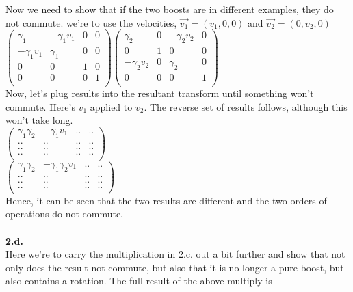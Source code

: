 \documentclass[prb,preprint]
{revtex4-1}
\newcommand{\PRLsep}{\noindent\makebox[\linewidth]{\resizebox{0.8888\linewidth}{2pt}{$\bullet$}}\bigskip}
\begin{document}
Now we need to show that if the two boosts are in different examples, they do not commute.  we're to use the velocities, $\vec{v_1} = \left(v_1, 0, 0\right)$ and $\vec{v_2} = \left(0, v_2, 0\right)$
\\
$\begin{pmatrix}
\gamma_1 & -\gamma_1 v_1 & 0 & 0\\
-\gamma_1 v_1 & \gamma_1 & 0 & 0\\
0 & 0 & 1 & 0\\
0 & 0 & 0 & 1\\
\end{pmatrix} 
\begin{pmatrix}
\gamma_2 & 0 & -\gamma_2 v_2 & 0\\
0 & 1 & 0 & 0\\
-\gamma_2 v_2 & 0 & \gamma_2 & 0\\
0 & 0 & 0 & 1\\
\end{pmatrix} $
\\
Now, let's plug results into the resultant transform until something won't commute.  Here's $v_1$ applied to $v_2$.  The reverse set of results follows, although this won't take long.
\\
$\begin{pmatrix}
\gamma_1 \gamma_2 & -\gamma_1 v_1 & .. & ..\\
.. & .. & .. & ..\\
.. & .. & .. & ..\\
.. & .. & .. & ..\\
\end{pmatrix}$
\\
$\begin{pmatrix}
\gamma_1 \gamma_2 & -\gamma_1 \gamma_2 v_1 & .. & ..\\
.. & .. & .. & ..\\
.. & .. & .. & ..\\
.. & .. & .. & ..\\
\end{pmatrix}$
\\
Hence, it can be seen that the two results are different and the two orders of operations do not commute.
\\
\PRLsep
\\
\textbf{2.d.}
\\
Here we're to carry the multiplication in 2.c. out a bit further and show that not only does the result not commute, but also that it is no longer a pure boost, but also contains a rotation.  The full result of the above multiply is
\end{document}
